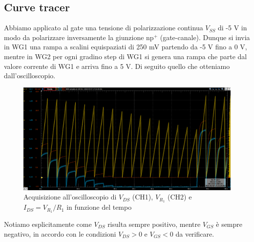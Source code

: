 \documentclass[10pt, a4paper, italian]{article}
\begin{document}
\subsection{Curve tracer}
Abbiamo applicato al gate una tensione di polarizzazione continua
$V_{SS}$ di -5 V in modo da polarizzare inversamente la giunzione
$\text{np}^+$ (gate-canale).
Dunque si invia in WG1 una rampa a scalini equispaziati di 250 mV partendo
da -5 V fino a 0 V, mentre in WG2 per ogni gradino step di WG1 si genera una
rampa che parte dal valore corrente di WG1 e arriva fino a 5 V.
Di seguito quello che otteniamo dall'oscilloscopio.
\begin{figure}[htbp]
    \centering
	\includegraphics[width=\textwidth]{timey}
    \caption{Acquisizione all'oscilloscopio di $V_{DS}$ (CH1), $V_{R_1}$ (CH2)
    e $I_{DS} = V_{R_1}/R_1$ in funzione del tempo \label{fig: ramp}}
\end{figure}

Notiamo esplicitamente come $V_{DS}$ risulta sempre positivo, mentre $V_{GS}$
è sempre negativo, in accordo con le condizioni $V_{DS} > 0$ e $V_{GS} < 0$
da verificare.
\end{document}
